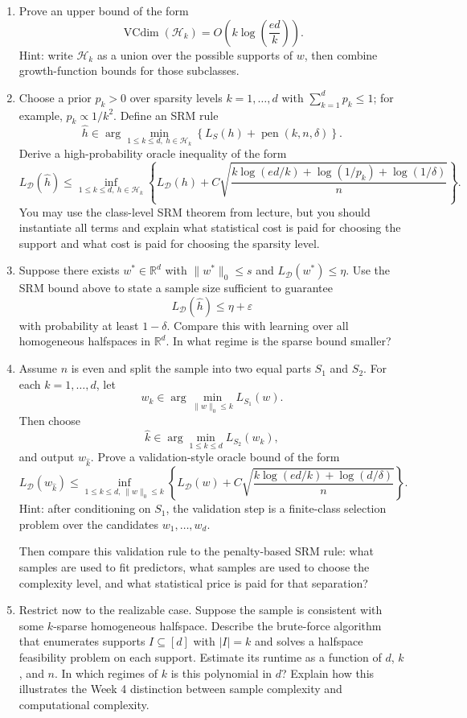 \documentclass{article}
\begin{document}
\begin{enumerate}
\item Prove an upper bound of the form
$$
\operatorname{VCdim}(\mathcal{H}_k)
=
O\!\left(k\log\!\left(\frac{ed}{k}\right)\right).
$$
Hint: write $\mathcal{H}_k$ as a union over the possible supports of $w$, then combine growth-function bounds for those subclasses.

\item Choose a prior $p_k>0$ over sparsity levels $k=1,\dots,d$ with $\sum_{k=1}^d p_k \le 1$; for example, $p_k \propto 1/k^2$. Define an SRM rule
$$
\widehat{h}
\in
\arg\min_{1\le k\le d,\ h\in\mathcal{H}_k}
\left\{
L_S(h) + \operatorname{pen}(k,n,\delta)
\right\}.
$$
Derive a high-probability oracle inequality of the form
$$
L_{\mathcal{D}}(\widehat{h})
\le
\inf_{1\le k\le d,\ h\in\mathcal{H}_k}
\left\{
L_{\mathcal{D}}(h)
+
C\sqrt{
\frac{
k\log(ed/k)+\log(1/p_k)+\log(1/\delta)
}{n}
}
\right\}.
$$
You may use the class-level SRM theorem from lecture, but you should instantiate all terms and explain what statistical cost is paid for choosing the support and what cost is paid for choosing the sparsity level.

\item Suppose there exists $w^* \in \mathbb{R}^d$ with $\|w^*\|_0 \le s$ and $L_{\mathcal{D}}(w^*) \le \eta$. Use the SRM bound above to state a sample size sufficient to guarantee
$$
L_{\mathcal{D}}(\widehat{h}) \le \eta + \varepsilon
$$
with probability at least $1-\delta$. Compare this with learning over all homogeneous halfspaces in $\mathbb{R}^d$. In what regime is the sparse bound smaller?

\item Assume $n$ is even and split the sample into two equal parts $S_1$ and $S_2$. For each $k=1,\dots,d$, let
$$
w_k \in \arg\min_{\|w\|_0 \le k} L_{S_1}(w).
$$
Then choose
$$
\widehat{k} \in \arg\min_{1\le k\le d} L_{S_2}(w_k),
$$
and output $w_{\widehat{k}}$. Prove a validation-style oracle bound of the form
$$
L_{\mathcal{D}}(w_{\widehat{k}})
\le
\inf_{1\le k\le d,\ \|w\|_0 \le k}
\left\{
L_{\mathcal{D}}(w)
+
C\sqrt{
\frac{
k\log(ed/k)+\log(d/\delta)
}{n}
}
\right\}.
$$
Hint: after conditioning on $S_1$, the validation step is a finite-class selection problem over the candidates $w_1,\dots,w_d$.

Then compare this validation rule to the penalty-based SRM rule: what samples are used to fit predictors, what samples are used to choose the complexity level, and what statistical price is paid for that separation?

\item Restrict now to the realizable case. Suppose the sample is consistent with some $k$-sparse homogeneous halfspace. Describe the brute-force algorithm that enumerates supports $I \subseteq [d]$ with $|I|=k$ and solves a halfspace feasibility problem on each support. Estimate its runtime as a function of $d$, $k$, and $n$. In which regimes of $k$ is this polynomial in $d$? Explain how this illustrates the Week 4 distinction between sample complexity and computational complexity.
\end{enumerate}
\end{document}
